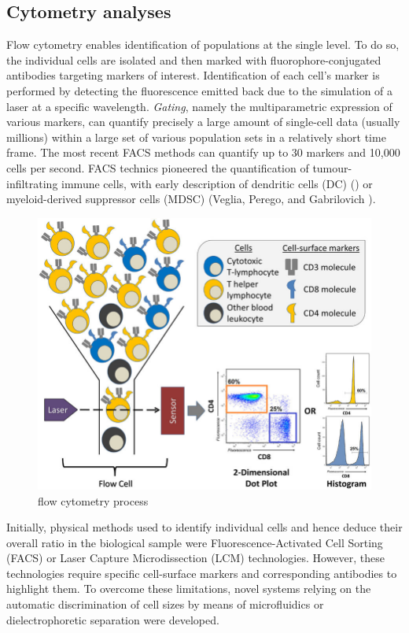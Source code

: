 \subsection{Cytometry analyses}
\label{cytometry-analyses}

Flow cytometry enables identification of populations at the single
level. To do so, the individual cells are isolated and then marked with
fluorophore-conjugated antibodies targeting markers of interest.
Identification of each cell's marker is performed by detecting the
fluorescence emitted back due to the simulation of a laser at a specific
wavelength. \emph{Gating}, namely the multiparametric expression of
various markers, can quantify precisely a large amount of single-cell
data (usually millions) within a large set of various population sets in
a relatively short time frame. The most recent FACS methods can quantify
up to 30 markers and 10,000 cells per second. FACS technics pioneered
the quantification of tumour-infiltrating immune cells, with early
description of dendritic cells (DC)
(\autocite{thurnher_etal96}) or
myeloid-derived suppressor cells (MDSC) (Veglia, Perego, and Gabrilovich
\autocite{veglia_etal18}).

\begin{figure}
\centering
\includegraphics{figures/A-brief-overview-of-a-flow-cytometry-experiment-identifying-the-proportions-of-T-helper.png}
\caption{flow cytometry process}
\end{figure}

Initially, physical methods used to identify individual cells and hence
deduce their overall ratio in the biological sample were
Fluorescence-Activated Cell Sorting (FACS) or Laser Capture
Microdissection (LCM) technologies. However, these technologies require
specific cell-surface markers and corresponding antibodies to highlight
them. To overcome these limitations, novel systems relying on the
automatic discrimination of cell sizes by means of microfluidics or
dielectrophoretic separation were developed.

